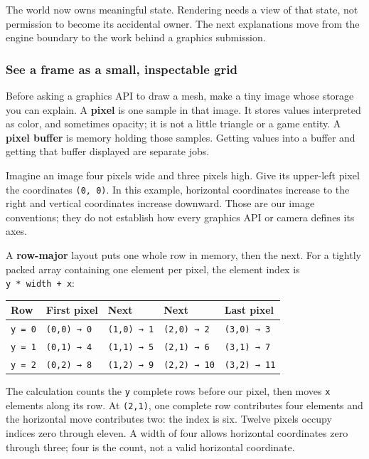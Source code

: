 The world now owns meaningful state. Rendering needs a view of that state, not permission to become its accidental owner. The next explanations move from the engine boundary to the work behind a graphics submission.

\subsubsection{See a frame as a small, inspectable grid}\label{see-a-frame-as-a-small-inspectable-grid}

Before asking a graphics API to draw a mesh, make a tiny image whose storage you can explain. A \textbf{pixel} is one sample in that image. It stores values interpreted as color, and sometimes opacity; it is not a little triangle or a game entity. A \textbf{pixel buffer} is memory holding those samples. Getting values into a buffer and getting that buffer displayed are separate jobs.

Imagine an image four pixels wide and three pixels high. Give its upper-left pixel the coordinates \texttt{(0,\ 0)}. In this example, horizontal coordinates increase to the right and vertical coordinates increase downward. Those are our image conventions; they do not establish how every graphics API or camera defines its axes.

A \textbf{row-major} layout puts one whole row in memory, then the next. For a tightly packed array containing one element per pixel, the element index is \texttt{y\ *\ width\ +\ x}:

{\def\LTcaptype{none} %
\begin{longtable}[]{@{}lllll@{}}
\toprule\noalign{}
Row & First pixel & Next & Next & Last pixel \\
\midrule\noalign{}
\endhead
\bottomrule\noalign{}
\endlastfoot
\texttt{y\ =\ 0} & \texttt{(0,0)\ →\ 0} & \texttt{(1,0)\ →\ 1} & \texttt{(2,0)\ →\ 2} & \texttt{(3,0)\ →\ 3} \\
\texttt{y\ =\ 1} & \texttt{(0,1)\ →\ 4} & \texttt{(1,1)\ →\ 5} & \texttt{(2,1)\ →\ 6} & \texttt{(3,1)\ →\ 7} \\
\texttt{y\ =\ 2} & \texttt{(0,2)\ →\ 8} & \texttt{(1,2)\ →\ 9} & \texttt{(2,2)\ →\ 10} & \texttt{(3,2)\ →\ 11} \\
\end{longtable}
}

The calculation counts the \texttt{y} complete rows before our pixel, then moves \texttt{x} elements along its row. At \texttt{(2,1)}, one complete row contributes four elements and the horizontal move contributes two: the index is six. Twelve pixels occupy indices zero through eleven. A width of four allows horizontal coordinates zero through three; four is the count, not a valid horizontal coordinate.

